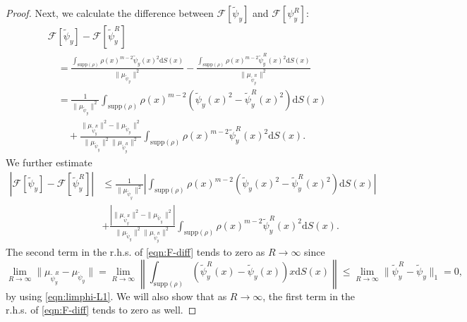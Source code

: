 \documentclass[10pt,a4paper]{amsart}
\newcommand{\dx}{\mathrm{d}S (x)}
\newcommand{\supp}{\mathrm{supp}(\rho)}
\begin{document}
\begin{proof}
Next, we calculate the difference between $\mathcal{F}[\tilde{\psi}_y]$ and $\mathcal{F}[\psi_{y}^R]$:
\begin{align*}
&\mathcal{F}[\tilde{\psi}_y]-\mathcal{F}[\tilde{\psi}_y^R]\\[2pt]
&\quad =\frac{\int_{\supp}\rho(x)^{m-2}\tilde{\psi}_y(x)^2\dx}{\|\mu_{\tilde{\psi}_y}\|^2}-\frac{\int_{\supp}\rho(x)^{m-2}\tilde{\psi}_y^R(x)^2\dx}{\|\mu_{\tilde{\psi}_y^R}\|^2}\\
&\quad =\frac{1}{\|\mu_{\tilde{\psi}_y}\|^2}\int_{\supp}\rho(x)^{m-2}\left(\tilde{\psi}_y(x)^2-\tilde{\psi}_y^R(x)^2\right)\dx\\[2pt]
&\qquad +\frac{\|\mu_{\tilde{\psi}_{y}^R}\|^2-\|\mu_{\tilde{\psi}_y}\|^2}{\|\mu_{\tilde{\psi}_y}\|^2\|\mu_{\tilde{\psi}_{y}^R}\|^2}\int_{\supp}\rho(x)^{m-2}\tilde{\psi}_y^R(x)^2\dx.
\end{align*}
We further estimate
\begin{equation}
\label{eqn:F-diff}
\begin{aligned}
\left|\mathcal{F}[\tilde{\psi}_y]-\mathcal{F}[\tilde{\psi}_y^R]\right|&\leq
\frac{1}{\|\mu_{\tilde{\psi}_y}\|^2}\left|
\int_{\supp}\rho(x)^{m-2}(\tilde{\psi}_y(x)^2-\tilde{\psi}_y^R(x)^2)\dx\right|
\\
&+\frac{\left|\|\mu_{\tilde{\psi}_{y}^R}\|^2-\|\mu_{\tilde{\psi}_y}\|^2\right|}{\|\mu_{\tilde{\psi}_y}\|^2\|\mu_{\tilde{\psi}_{y}^R}\|^2}
\int_{\supp}\rho(x)^{m-2}\tilde{\psi}_y^R(x)^2\dx.
\end{aligned}
\end{equation}
The second term in the r.h.s. of \eqref{eqn:F-diff} tends to zero as $R\to\infty$ since
\[
\lim_{R\to\infty}\|\mu_{\tilde{\psi}_y^R}-\mu_{\tilde{\psi}_y}\|=\lim_{R\to\infty}\left\|\int_{\supp}(\tilde{\psi}_y^R(x)-\tilde{\psi}_y(x))x\dx\right\|\leq \lim_{R\to\infty} \|\tilde{\psi}_y^R-\tilde{\psi}_y\|_1=0,
\]
by using \eqref{eqn:limphi-L1}. We will also show that as $R \to \infty$, the first term in the r.h.s. of \eqref{eqn:F-diff} tends to zero as well. 


\end{proof}
\end{document}
